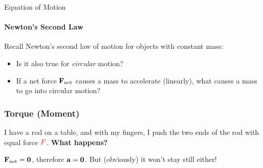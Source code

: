 \documentclass[12pt,compress,aspectratio=169]{beamer}
\newcommand{\mb}[1]{\ensuremath\mathbf{#1}}
\newcommand{\eq}[2]{\vspace{#1}{\Large\begin{displaymath}#2\end{displaymath}}}
\begin{document}
\begin{frame}{Equation of Motion}
  \framesubtitle{Newton's Second Law}

  Recall Newton's second law of motion for objects with constant mass:
    
  \eq{-.2in}{
    \mb{F}_\mathrm{net}=m\mb{a}
  }
  \begin{itemize}
  \item Is it also true for \emph{circular} motion?
  \item If a net force $\mb{F}_\mathrm{net}$ causes a mass to accelerate
    (linearly), what causes a mass to go into circular motion?
  \end{itemize}

\end{frame}

\begin{frame}
  \frametitle{Torque (Moment)}
  I have a rod on a table, and with my fingers, I push the two ends of the rod
  with equal force $\textcolor{red}{F}$. \textbf{What happens?}
  \begin{center}
  \end{center}
  $\mb{F}_\mathrm{net}=\mb{0}$, therefore $\mb{a}=\mb{0}$. But (obviously) it
  won't stay still either!
\end{frame}
\end{document}
